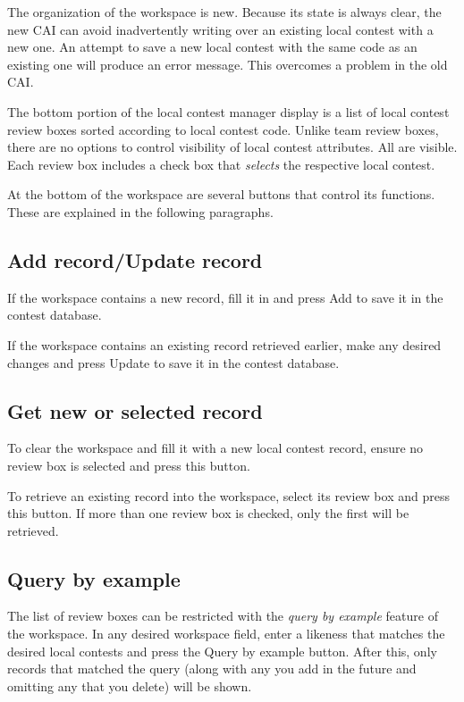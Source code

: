 \documentclass[11pt,letterpaper]{refart}
\def\ui#1{\textsf{#1}}
\begin{document}
The organization of the workspace is new. Because its state is always clear,
the new CAI can avoid inadvertently writing over an existing local contest with a new
one. An attempt to save a new local contest with the same code as an existing
one will produce an error message. This overcomes a problem in the old CAI.

The bottom portion of the local contest manager display
is a list of local contest review boxes sorted according to local contest code. 
Unlike team review boxes, there are no
options to control visibility of local contest attributes. All are visible. Each review
box includes a check box that \emph{selects} the respective local contest.

At the bottom of the workspace are several buttons that control its functions. These
are explained in the following paragraphs.

\subsection{Add record/Update record}
If the workspace contains a new record, fill it in and press \ui{Add} to 
save it in the contest database. 

If the workspace contains an existing record retrieved earlier, make any
desired changes and press \ui{Update} to save it in the contest database.

\subsection{Get new or selected record}
To clear the workspace and fill it with a new local contest record, ensure no 
review box is selected and press this button.

To retrieve an existing record into the workspace, select 
its review box and press this button. If more than one review box is
checked, only the first will be retrieved. 

\subsection{Query by example}
\label{sec:qbe}
The list of review boxes can be restricted with the \emph{query by example}
feature of the workspace. In any desired workspace field, enter a likeness
that matches the desired local contests and press the \ui{Query by example}
button. After this, only records that matched the query (along with any you
add in the future and omitting any that you delete) will be shown.
\end{document}
